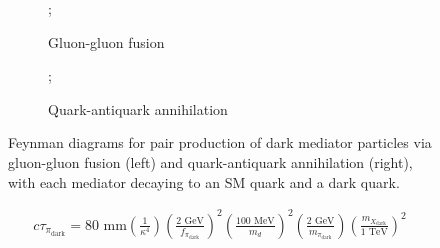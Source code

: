 \begin{figure}[h]
    \centering
    \begin{subfigure}{0.45\textwidth}
        \centering
        ;
        \caption{Gluon-gluon fusion}
    \end{subfigure}
    \hfill
    \begin{subfigure}{0.45\textwidth}
        \centering
        ;
        \caption{Quark-antiquark annihilation}
    \end{subfigure}
    \caption{Feynman diagrams for pair production of dark mediator particles via gluon-gluon fusion (left) and quark-antiquark annihilation (right), with each mediator decaying to an SM quark and a dark quark.}
    \label{fig:feynman_diagrams}
\end{figure}

\begin{equation}
	\begin{aligned}
		c\tau_{\pi_{\text{dark}}} = 80 \text{ mm} \left(\frac{1}{\kappa^4}\right) \left(\frac{2 \text{ GeV}}{f_{\pi_{\text{dark}}}}\right)^2 \left(\frac{100 \text{ MeV}}{m_d}\right)^2 \left(\frac{2 \text{ GeV}}{m_{\pi_{\text{dark}}}}\right)  \left(\frac{m_{X_{\text{dark}}}}{1 \text{ TeV}}\right)^2
	\end{aligned}
\end{equation}

